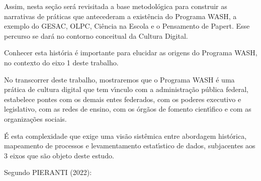 \documentclass[
12pt,		%
openright,	%
twoside,  %
a4paper,			%
chapter=TITLE,		%
english,			%
french,				%
spanish,			%
brazil				%
]{USPSC-classe/USPSC}
\begin{document}
Assim, nesta se\c{c}\~ao ser\'a revisitada a base metodol\'ogica para construir as narrativas de pr\'aticas  que antecederam a exist\^encia do Programa WASH, a exemplo do GESAC, OLPC, Ci\^encia na Escola e o Pensamento de Papert. Esse percurso se dar\'a no contorno conceitual da Cultura Digital.














Conhecer esta hist\'oria \'e importante para elucidar as origens do Programa WASH, no contexto do eixo 1 deste trabalho.














No transcorrer deste trabalho, mostraremos que o Programa WASH \'e uma pr\'atica de cultura digital que tem v\'{\i}nculo com a administra\c{c}\~ao p\'ublica federal, estabelece pontes com os demais entes federados, com os poderes executivo e legislativo, com as redes de ensino, com os \'org\~aos de fomento cient\'{\i}fico e com as organiza\c{c}\~oes sociais.














\'E esta complexidade que exige uma vis\~ao sist\^emica entre abordagem hist\'orica, mapeamento de processos e levamentamento estat\'{\i}stico de dados, subjacentes aos 3 eixos que s\~ao objeto deste estudo.














Segundo PIERANTI (2022):















\noindent\begin{center}\mbox{\centering{}}\end{center}
\end{document}

